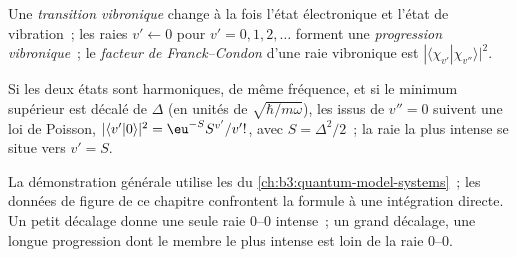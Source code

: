 \begin{definition}\label{def:b3:electronic-spectroscopy:vibronic}
Une \emph{transition vibronique} change à la
fois l'état électronique et l'état de vibration~; les raies
$v' \leftarrow 0$ pour $v' = 0, 1, 2,
\dots$ forment une \emph{progression vibronique}~;
le \emph{facteur de Franck--Condon} d'une
raie vibronique est
$|\langle\chi_{v'}|\chi_{v''}\rangle|^2$.
\end{definition}

\begin{proposition}\label{prop:b3:electronic-spectroscopy:displaced}
Si les deux états sont harmoniques, de même fréquence, et si le minimum
supérieur est décalé de $\Delta$ (en unités de $\sqrt{\hbar/m\omega}$),
les  issus de $v'' = 0$ suivent une loi de
Poisson,
$|\langle v'|0\rangle|^2 = \eu^{-S}S^{v'}/v'!$, avec $S = \Delta^2/2$~; la
raie la plus intense se situe vers $v' = S$.
\end{proposition}
\admitted

La démonstration générale utilise les  du
\cref{ch:b3:quantum-model-systems}~; les données de figure de ce
chapitre confrontent la formule à une intégration directe. Un petit
décalage donne une seule raie 0--0 intense~; un grand décalage, une
longue progression dont le membre le plus intense est loin de la raie
0--0.

